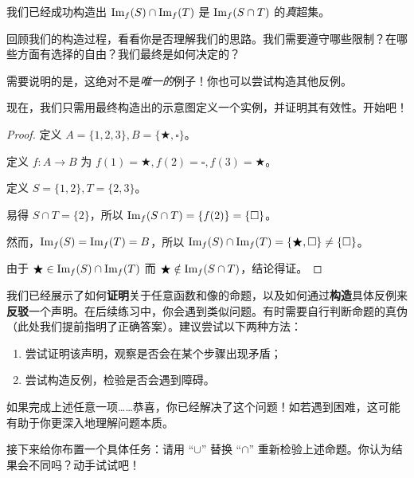 我们已经成功构造出 $\text{Im}_f (S) \cap \text{Im}_f (T)$ 是 $\text{Im}_f (S \cap T)$ 的\emph{真}超集。

回顾我们的构造过程，看看你是否理解我们的思路。我们需要遵守哪些限制？在哪些方面有选择的自由？我们最终是如何决定的？

需要说明的是，这绝对不是\emph{唯一的}例子！你也可以尝试构造其他反例。

现在，我们只需用最终构造出的示意图定义一个实例，并证明其有效性。开始吧！

\begin{proof}
    定义 $A = \{1, 2, 3\}, B = \{\bigstar, \square\}$。

    定义 $f : A \to B$ 为 $f(1) = \bigstar, f(2) = \square, f(3) = \bigstar$。

    定义 $S = \{1, 2\}, T = \{2, 3\}$。

    易得 $S \cap T = \{2\}$，所以 $\text{Im}_f (S \cap T) = \{f(2)\} = \{\square\}$。

    然而，$\text{Im}_f (S) = \text{Im}_f (T) = B$，所以 $\text{Im}_f (S) \cap \text{Im}_f (T) = \{\bigstar, \square\} \ne \{\square\}$。

    由于 $\bigstar \in \text{Im}_f (S) \cap \text{Im}_f (T)$ 而 $\bigstar \notin \text{Im}_f (S \cap T)$，结论得证。
\end{proof}

我们已经展示了如何\textbf{证明}关于任意函数和像的命题，以及如何通过\textbf{构造}具体反例来\textbf{反驳}一个声明。在后续练习中，你会遇到类似问题。有时需要自行判断命题的真伪（此处我们提前指明了正确答案）。建议尝试以下两种方法：
\begin{enumerate}[label=(\arabic*)]
    \item 尝试证明该声明，观察是否会在某个步骤出现矛盾；
    \item 尝试构造反例，检验是否会遇到障碍。
\end{enumerate}
如果完成上述任意一项……恭喜，你已经解决了这个问题！如若遇到困难，这可能有助于你更深入地理解问题本质。

接下来给你布置一个具体任务：请用 ``$\cup$'' 替换 ``$\cap$'' 重新检验上述命题。你认为结果会不同吗？动手试试吧！
